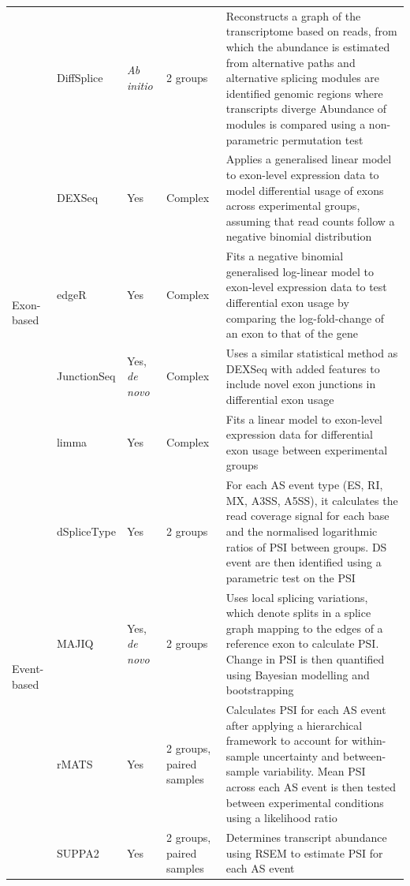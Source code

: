 \begin{landscape}
\begin{longtable}[c]{p{2.5cm}p{2cm}p{2cm}p{2.5cm}p{17cm}}
	&
	DiffSplice &
	\textit{Ab initio} &
	2 groups &
	\tabitem Reconstructs a graph of the transcriptome based on reads, from   which the abundance is estimated from alternative paths and alternative splicing modules are identified genomic regions where transcripts diverge \newline 
	\tabitem  Abundance of modules is compared using a non-parametric permutation test \\ \cmidrule(l){1-5} 
	\multirow{4}{*}{Exon-based} &
	DEXSeq &
	Yes &
	Complex &
	\tabitem Applies a generalised linear model to exon-level expression data to model differential usage of exons across experimental groups, assuming that read counts follow a negative binomial distribution \\ 		
	&
	edgeR &
	Yes &
	Complex &
	\tabitem Fits a negative binomial generalised log-linear model to exon-level expression data  to test differential exon usage by comparing the log-fold-change of an exon to that of the gene \\
	&
	JunctionSeq &
	Yes, \textit{de novo} &
	Complex &
	\tabitem Uses a similar statistical method as DEXSeq with added features to include novel exon junctions in differential exon usage \\	
	&
	limma &
	Yes &
	Complex &
	\tabitem Fits a linear model to exon-level expression data for differential exon usage between experimental groups \\ \cmidrule(l){1-5} 
	\multirow{4}{*}{Event-based} &
	dSpliceType &
	Yes &
	2 groups &
	\tabitem For each AS event type (ES, RI, MX, A3SS, A5SS), it calculates the read coverage signal for each base and the normalised  logarithmic ratios of PSI between groups. DS event are then identified using a parametric test on the PSI \\ 			
	& 
	MAJIQ &
	Yes, \textit{de novo} &
	2 groups &
	\tabitem Uses local splicing variations, which denote splits in a splice graph mapping to the edges of a reference exon to calculate PSI.   
	\tabitem Change in PSI is then quantified using Bayesian modelling and bootstrapping \\ 		

	&
	rMATS &
	Yes &
	2 groups, \newline paired samples &
	\tabitem Calculates PSI for each AS event after applying a hierarchical framework to account for within-sample uncertainty and between-sample variability.
	\tabitem Mean PSI across each AS event is then tested between experimental conditions using a likelihood ratio \\ 	
	&
	SUPPA2 &
	Yes &
	2 groups, \newline paired samples &
	\tabitem Determines transcript abundance using RSEM to estimate PSI   for each AS event \\* \bottomrule 
	\end{longtable}
\end{landscape}
\restoregeometry

